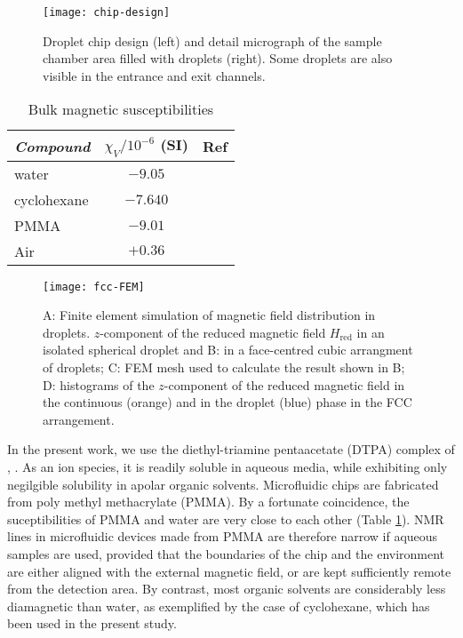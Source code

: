 \begin{figure}
  \begin{center}
    \texttt{[image: chip-design]}
  \end{center}
  \caption{Droplet chip design (left) and detail micrograph of the sample chamber
  area filled with droplets (right). Some droplets are also visible in the
  entrance and exit channels.}
  \label{fig:chip-design}
\end{figure}

\begin{table}
  \begin{center}
    \caption{Bulk magnetic susceptibilities
    \label{tab:suscept}}
    \begin{tabular}{lcc}\hline\hline
      \emph{Compound} & $\chi_V/10^{-6}$ (SI) & Ref \\ \hline
      water           & $-9.05$               &    \cite{Rumble:2017tp}  \\
      cyclohexane     & $-7.640$              &    \cite{Rumble:2017tp} \\
      PMMA            & $-9.01$               &    \cite{Wapler:2014es}\\
      Air             & $+0.36$               &    \cite{Bakker:2006eea} \\ \hline\hline
    \end{tabular}
  \end{center}
\end{table}

\begin{figure}
  \begin{center}
    \texttt{[image: fcc-FEM]}
  \end{center}
  \caption{A: Finite element simulation of magnetic field distribution in droplets.
      $z$-component of the reduced magnetic field $H_\text{red}$ in an isolated spherical droplet
      and B: in a face-centred cubic arrangment of droplets; C: FEM mesh used
      to calculate the result shown in B; D: histograms of the $z$-component
      of the reduced magnetic field in the continuous (orange) and in the droplet (blue) phase
      in the FCC arrangement.
    }
  \label{fig:FEM-fcc}
\end{figure}

In the present work, we use the diethyl-triamine pentaacetate (DTPA) complex
of , . As an ion species, it is readily soluble
in aqueous media, while exhibiting only negilgible solubility in apolar organic
solvents. Microfluidic chips are fabricated from poly methyl methacrylate (PMMA).
By a fortunate coincidence, the suceptibilities of PMMA and
water are very close to
each other (Table \ref{tab:suscept}).  NMR lines
in microfluidic devices made from PMMA are therefore narrow
if  aqueous
samples are used, provided that the boundaries of the chip and the environment
are either aligned with the external magnetic field, or are kept sufficiently
remote from the detection area.
 By contrast, most organic solvents are
considerably less diamagnetic than water, as exemplified by the
case of cyclohexane, which has been used in the present study.

